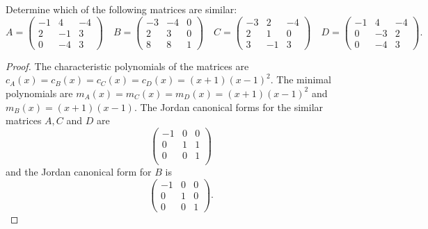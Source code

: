 \documentclass[10pt]{amsart}
\begin{document}
\begin{thm}
  \label{Ex3}
  Determine which of the following matrices are similar:
  $$
  A = \begin{pmatrix}
    -1 & 4 & -4\\
    2 & -1 & 3\\
    0 & -4 & 3
  \end{pmatrix}
  \quad
  B = \begin{pmatrix}
    -3 & -4 & 0\\
    2 & 3 & 0\\
    8 & 8 & 1
  \end{pmatrix}
  \quad
  C = \begin{pmatrix}
    -3 & 2 & -4\\
    2 & 1 & 0\\
    3 & -1 & 3
  \end{pmatrix}
  \quad
  D = \begin{pmatrix}
    -1 & 4 & -4\\
    0 & -3 & 2\\
    0 & -4 & 3
  \end{pmatrix}.
  $$
  \begin{proof}
    The characteristic polynomials of the matrices are $c_A(x) = c_B(x) = c_C(x) = c_D(x) = (x+1)(x-1)^2$.
    The minimal polynomials are $m_A(x) = m_C(x) = m_D(x) = (x+1)(x-1)^2$ and $m_B(x) = (x+1)(x-1)$.
    The Jordan canonical forms for the similar matrices $A, C$ and $D$ are 
    $$
    \begin{pmatrix}
      -1 & 0 & 0\\
      0 & 1 & 1\\
      0 & 0 & 1\\
    \end{pmatrix}
    $$
    and the Jordan canonical form for $B$ is 
    $$
    \begin{pmatrix}
      -1 & 0 & 0\\
      0 & 1 & 0\\
      0 & 0 & 1
    \end{pmatrix}.
    $$
  \end{proof}
\end{thm}
\end{document}
